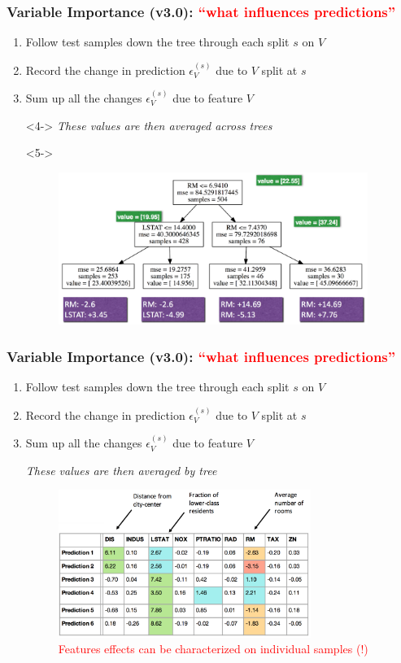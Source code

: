 \documentclass[xcolor={dvipsnames}]{beamer}
\begin{document}
\frame
{
\frametitle{Variable Importance (v3.0): \textcolor{red}{``what influences predictions''}}
\begin{enumerate}
\item<1-> Follow test samples down the tree through each split $s$ on $V$
\item<2-> Record the change in prediction $\epsilon^{(s)}_V$ due to $V$ split at $s$ 
\item<3-> Sum up all the changes $\epsilon^{(s)}_V$ due to feature $V$
\item[]<4-> \emph{These values are then averaged across trees}
\item[]<5->
\begin{figure}
\centering
\includegraphics[height=1.955in]{stuffs/flow.png}
\end{figure}
\end{enumerate}
}

\frame
{
\frametitle{Variable Importance (v3.0): \textcolor{red}{``what influences predictions''}}
\begin{enumerate}
\item Follow test samples down the tree through each split $s$ on $V$
\item Record the change in prediction $\epsilon^{(s)}_V$ due to $V$ split at $s$ 
\item Sum up all the changes $\epsilon^{(s)}_V$ due to feature $V$
\item[] \emph{These values are then averaged by tree}
\item[]
\begin{figure}
\centering %
\includegraphics[height=1.89in]{stuffs/flow2.png}\\
\textcolor{red}{Features effects can be characterized on individual samples (!)}%
\end{figure}
\end{enumerate}
}
\end{document}
